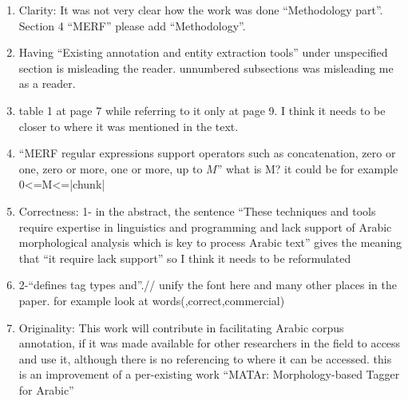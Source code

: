 \begin{enumerate}[leftmargin=0mm,label=\bfseries CommentR3.\arabic*]
\item \label{Review.3.28}
Clarity:  
It was not very clear how the work was done 
``Methodology part''. 
Section 4 ``MERF'' please add ``Methodology''.



\item \label{Review.3.29}
Having ``Existing annotation and entity extraction tools'' 
under unspecified section is misleading the reader. 
unnumbered subsections was misleading me as a reader. 


\item \label{Review.3.30}
table 1 at page 7 while referring to it only at page 9. 
I think it needs to be closer to where it was mentioned in the text. 


\item \label{Review.3.31}
``MERF regular expressions support operators such as concatenation, zero or one, zero or more, one or more, up to $M$” what is M? 
it could be for example 0<=M<=|chunk| 




\item \label{Review.3.32}
Correctness: 
1- in the abstract, the sentence ``These techniques and 
tools require expertise in linguistics and programming and 
lack support of Arabic morphological analysis which is key to 
process Arabic text''
gives the meaning that ``it require lack support'' so I think it 
needs to be reformulated 



\item \label{Review.3.33}
2-``defines tag types and''.// unify the font here and 
many other places in the paper. 
for example look at words(,correct,commercial)


\item \label{Review.3.34}
Originality:  
This work will contribute in facilitating Arabic corpus 
annotation, if it was made available for other researchers in 
the field to access and use it, although there is no 
referencing to where it can be accessed. 
this is an improvement of a per-existing work ``MATAr: Morphology-based Tagger for Arabic''



\end{enumerate}
